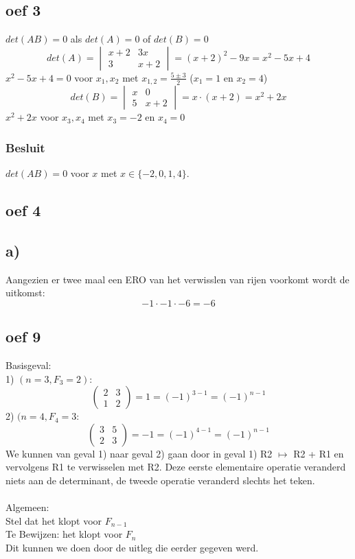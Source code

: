 \documentclass[10pt,a4paper]{article}
\begin{document}
\subsection*{oef 3}
\begin{center}
$det(AB) = 0$ als $det(A) = 0$ of $det(B) = 0$
\\
\[det(A) = \begin{vmatrix}
x + 2 & 3x\\
3 & x + 2
\end{vmatrix}
 = (x + 2)^2 - 9x = x^2 -5 x + 4
\]
$x^2 -5 x + 4 = 0$ voor $x_1, x_2$ met $x_{1,2} = \frac{5 \pm 3}{2}$ ($x_1 = 1$ en $x_2 = 4$)
\\
\[det(B) = \begin{vmatrix}
x & 0\\
5 & x + 2
\end{vmatrix}
 = x \cdot (x + 2) = x^2 + 2x\]
$x^2 + 2x$ voor $x_3, x_4$ met $x_3 = -2$ en $x_4 = 0$
\end{center}
\subsubsection*{Besluit}
$det(AB) = 0$ voor $x$ met $x \in \{-2, 0, 1, 4\}$.
\subsection*{oef 4}
\subsection*{a)}
Aangezien er twee maal een ERO van het verwisslen van rijen voorkomt wordt de uitkomst:
$$-1\cdot -1\cdot -6 = -6$$

\subsection*{oef 9}
Basisgeval: \\
1) $(n=3, F_{3}=2):$
\[ 
\begin{pmatrix}
2 & 3\\ 
1 & 2
\end{pmatrix}
= 1 = (-1)^{3-1} = (-1)^{n-1}
\]
2) $(n=4, F_{4}=3:$
\[
\begin{pmatrix}
3 & 5\\ 
2 & 3
\end{pmatrix}
= -1 = (-1)^{4-1} = (-1)^{n-1}
\]
We kunnen van geval 1) naar geval 2) gaan door in geval 1) R2 $\longmapsto $ R2 + R1 en vervolgens R1 te verwisselen met R2. Deze eerste elementaire operatie veranderd niets aan de determinant, de tweede operatie veranderd slechts het teken. \\
\\
Algemeen:\\
Stel dat het klopt voor $F_{n-1}$\\
Te Bewijzen: het klopt voor $F_{n}$\\
Dit kunnen we doen door de uitleg die eerder gegeven werd.
\end{document}
